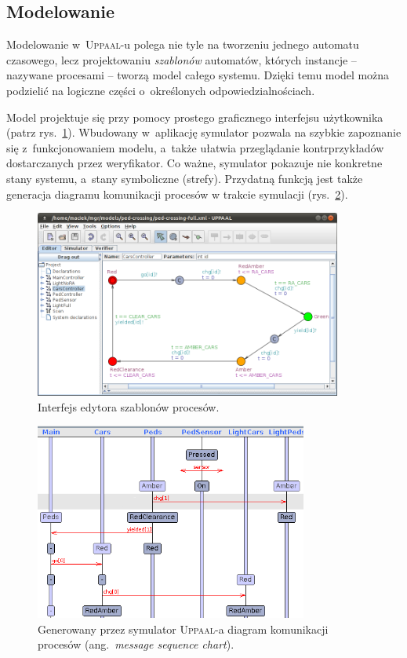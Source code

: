 \documentclass{pracamgr}
\newcommand{\ang}[1]{(ang.~\emph{#1})}
\newcommand{\upp}{\textsc{Uppaal}}
\theoremstyle{plain}
\begin{document}
\subsection{Modelowanie}
Modelowanie w~\upp-u polega nie tyle na tworzeniu jednego automatu
czasowego, lecz projektowaniu \emph{szablonów} automatów, których
instancje -- nazywane procesami -- tworzą model całego systemu. Dzięki
temu model można podzielić na logiczne części o~określonych
odpowiedzialnościach.

Model projektuje się przy pomocy prostego graficznego interfejsu
użytkownika (patrz rys.~\ref{img:uppaal-gui}). Wbudowany w~aplikację
symulator pozwala na szybkie zapoznanie się z~funkcjonowaniem modelu,
a~także ułatwia przeglądanie kontrprzykładów dostarczanych przez
weryfikator. Co ważne, symulator pokazuje nie konkretne stany systemu,
a~stany symboliczne (strefy). Przydatną funkcją jest także generacja
diagramu komunikacji procesów w trakcie symulacji
(rys.~\ref{img:uppaal-msc}).
\begin{figure}
  \centering
  \includegraphics[width=0.9\textwidth]{img/uppaal-editor.png}
  \caption{Interfejs edytora szablonów procesów.}
  \label{img:uppaal-gui}
\end{figure}

\begin{figure}
  \centering
  \includegraphics[width=0.8\textwidth]{img/uppaal-msc.png}
  \caption{Generowany przez symulator \upp-a diagram komunikacji
    procesów \ang{message sequence chart}.}
  \label{img:uppaal-msc}
\end{figure}
\end{document}
